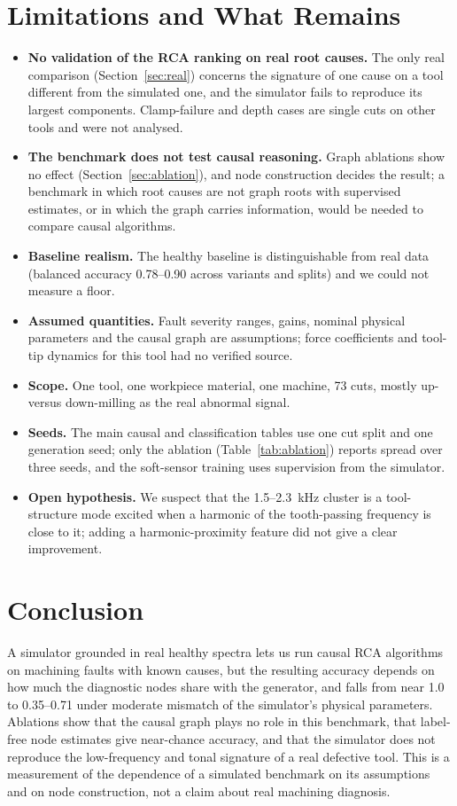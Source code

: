 \documentclass[11pt]{article}
\begin{document}
\section{Limitations and What Remains}\label{sec:limits}
\begin{itemize}
\item \textbf{No validation of the RCA ranking on real root causes.} The only real comparison (Section~\ref{sec:real}) concerns the signature of one cause on a tool different from the simulated one, and the simulator fails to reproduce its largest components. Clamp-failure and depth cases are single cuts on other tools and were not analysed.
\item \textbf{The benchmark does not test causal reasoning.} Graph ablations show no effect (Section~\ref{sec:ablation}), and node construction decides the result; a benchmark in which root causes are not graph roots with supervised estimates, or in which the graph carries information, would be needed to compare causal algorithms.
\item \textbf{Baseline realism.} The healthy baseline is distinguishable from real data (balanced accuracy 0.78--0.90 across variants and splits) and we could not measure a floor.
\item \textbf{Assumed quantities.} Fault severity ranges, gains, nominal physical parameters and the causal graph are assumptions; force coefficients and tool-tip dynamics for this tool had no verified source.
\item \textbf{Scope.} One tool, one workpiece material, one machine, 73 cuts, mostly up- versus down-milling as the real abnormal signal.
\item \textbf{Seeds.} The main causal and classification tables use one cut split and one generation seed; only the ablation (Table~\ref{tab:ablation}) reports spread over three seeds, and the soft-sensor training uses supervision from the simulator.
\item \textbf{Open hypothesis.} We suspect that the 1.5--2.3~kHz cluster is a tool-structure mode excited when a harmonic of the tooth-passing frequency is close to it; adding a harmonic-proximity feature did not give a clear improvement.
\end{itemize}

\section{Conclusion}
A simulator grounded in real healthy spectra lets us run causal RCA algorithms on machining faults with known causes, but the resulting accuracy depends on how much the diagnostic nodes share with the generator, and falls from near 1.0 to 0.35--0.71 under moderate mismatch of the simulator's physical parameters.
Ablations show that the causal graph plays no role in this benchmark, that label-free node estimates give near-chance accuracy, and that the simulator does not reproduce the low-frequency and tonal signature of a real defective tool.
This is a measurement of the dependence of a simulated benchmark on its assumptions and on node construction, not a claim about real machining diagnosis.
\end{document}
